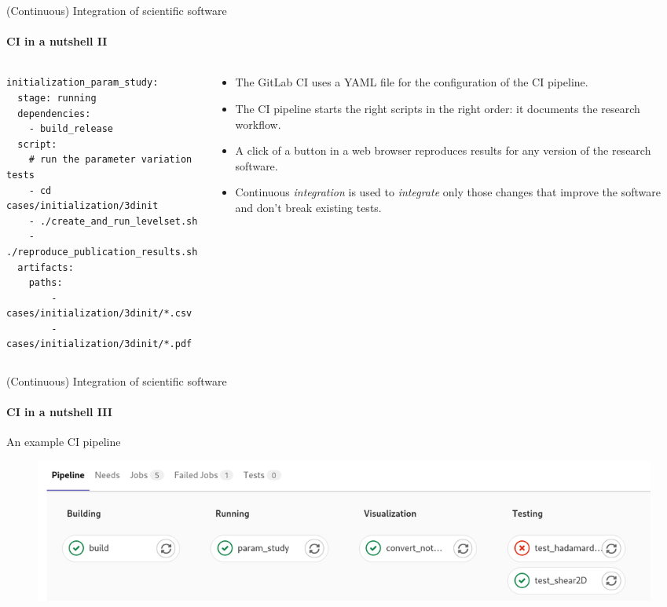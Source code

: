 \begin{frame}[fragile]{(Continuous) Integration of scientific software} 
\framesubtitle{CI in a nutshell II}

    \begin{columns}
        \begin{column}[c]{0.5\textwidth}
            \begin{verbatim}
initialization_param_study:
  stage: running
  dependencies:
    - build_release
  script: 
    # run the parameter variation tests 
    - cd cases/initialization/3dinit
    - ./create_and_run_levelset.sh
    - ./reproduce_publication_results.sh
  artifacts:
    paths:
        - cases/initialization/3dinit/*.csv 
        - cases/initialization/3dinit/*.pdf 
            \end{verbatim}
        \end{column}
        \begin{column}[c]{0.5\textwidth}
            \begin{itemize}
                \item The GitLab CI uses a YAML file for the configuration of the CI pipeline. 
                \item The CI pipeline starts the right scripts in the right order: it documents the research workflow.
                \item A click of a button in a web browser reproduces results for any version of the research software.
                \item Continuous \emph{integration} is used to \emph{integrate} only those changes that improve the software and don't break existing tests.
            \end{itemize}
        \end{column}
    \end{columns}

\end{frame}

\begin{frame}[fragile]{(Continuous) Integration of scientific software} 
\framesubtitle{CI in a nutshell III}

    \vfill

    An example CI pipeline 
    \begin{figure}
        \includegraphics[width=\textwidth]{figures/pipeline-example.png}
    \end{figure}

\end{frame}

